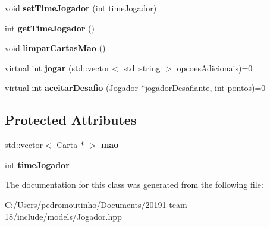 \begin{DoxyCompactItemize}
void {\bfseries set\+Time\+Jogador} (int time\+Jogador)
\item 
\mbox{\label{class_jogador_a6445980bae531aaca239735557140ffa}} 
int {\bfseries get\+Time\+Jogador} ()
\item 
\mbox{\label{class_jogador_ae9be28c426f205bb1496d38324befc62}} 
void {\bfseries limpar\+Cartas\+Mao} ()
\item 
\mbox{\label{class_jogador_a8af760d8531f7d4e78fc767adcff0cb6}} 
virtual int {\bfseries jogar} (std\+::vector$<$ std\+::string $>$ opcoes\+Adicionais)=0
\item 
\mbox{\label{class_jogador_a4eceb45cff559f97cd441da30d36769c}} 
virtual int {\bfseries aceitar\+Desafio} (\mbox{\hyperlink{class_jogador}{Jogador}} $\ast$jogador\+Desafiante, int pontos)=0
\end{DoxyCompactItemize}
\subsection*{Protected Attributes}
\begin{DoxyCompactItemize}
\item 
\mbox{\label{class_jogador_ad989cab8e9aa172ddb6ed89d019a7e91}} 
std\+::vector$<$ \mbox{\hyperlink{class_carta}{Carta}} $\ast$ $>$ {\bfseries mao}
\item 
\mbox{\label{class_jogador_a799f588b8a5c2504c6a290e617983808}} 
int {\bfseries time\+Jogador}
\end{DoxyCompactItemize}


The documentation for this class was generated from the following file\+:\begin{DoxyCompactItemize}
\item 
C\+:/\+Users/pedromoutinho/\+Documents/20191-\/team-\/18/include/models/Jogador.\+hpp\end{DoxyCompactItemize}

